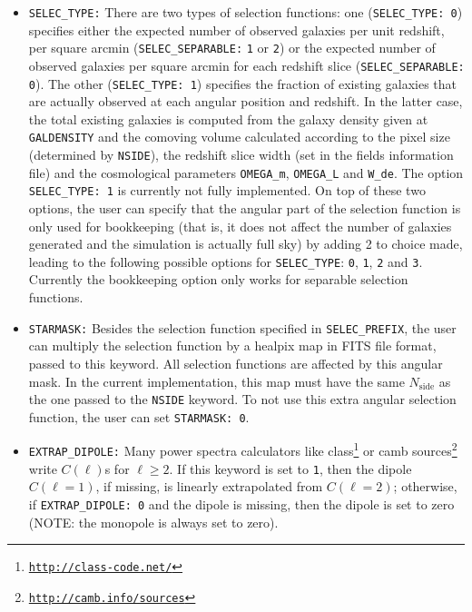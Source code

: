 \documentclass[12pt]{book} %
\newcommand{\nv}[1]{\mathrm{#1}}                 %
\begin{document}
\begin{itemize}
\item {\tt SELEC\_TYPE:} There are two types of selection functions: one ({\tt SELEC\_TYPE: 0}) 
  specifies either the expected number of observed galaxies per unit redshift, per square arcmin 
  ({\tt SELEC\_SEPARABLE:} {\tt 1} or {\tt 2}) or the expected number of observed galaxies per square arcmin for each 
  redshift slice ({\tt SELEC\_SEPARABLE: 0}). The other ({\tt SELEC\_TYPE: 1}) specifies the 
  fraction of existing galaxies that are actually observed at each angular 
  position and redshift. In the latter case, the total existing galaxies 
  is computed from the galaxy density given at {\tt GALDENSITY} and the comoving volume calculated 
  according to the pixel size (determined by {\tt NSIDE}), the redshift slice width (set in the 
  fields information file) and the cosmological parameters {\tt OMEGA\_m}, {\tt OMEGA\_L} and 
  {\tt W\_de}. The option {\tt SELEC\_TYPE: 1} is currently not fully implemented. On top of these 
  two options, the user can specify that the angular part of the selection function is only 
  used for bookkeeping (that is, it does not affect the number of galaxies generated and the 
  simulation is actually full sky) by adding 2 to choice made, leading to the following possible 
  options for {\tt SELEC\_TYPE}: {\tt 0}, {\tt 1}, {\tt 2} and {\tt 3}. Currently the bookkeeping 
  option only works for separable selection functions. 

\item {\tt STARMASK:} Besides the selection function specified in {\tt SELEC\_PREFIX}, the user 
  can multiply the selection function by a {\sc healpix} map in FITS file format, passed to this 
  keyword. All selection functions are affected by this angular mask. In the current implementation, 
  this map must have the same $N_{\nv{side}}$ as the one passed to the {\tt NSIDE} keyword.
  To not use this extra angular selection function, the user can set {\tt STARMASK: 0}.

\item {\tt EXTRAP\_DIPOLE:} Many power spectra calculators like 
  {\sc class}\footnote{\tt{\href{http://class-code.net/}{http://class-code.net/}}} or 
  {\sc camb sources}\footnote{\tt{\href{http://camb.info/sources}{http://camb.info/sources}}} 
  write $C(\ell)$s for $\ell\geq 2$. If this keyword is set to {\tt 1}, then the dipole $C(\ell=1)$, 
  if missing, is linearly extrapolated from $C(\ell=2)$; otherwise, if {\tt EXTRAP\_DIPOLE: 0} and the 
  dipole is missing, then the dipole is set to zero (NOTE: the monopole is always set to zero).


\end{itemize}
\end{document}
